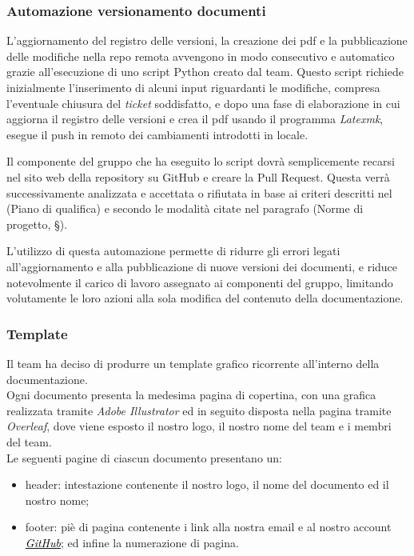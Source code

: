\documentclass[10pt, a4paper]{article}
\begin{document}
    \subsubsection{Automazione versionamento documenti}
    \label{sec:automazione_docs}
    L'aggiornamento del registro delle versioni, la creazione dei pdf e la pubblicazione delle modifiche nella repo remota avvengono in modo consecutivo e automatico grazie all'esecuzione di uno script Python creato dal team.
    Questo script richiede inizialmente l'inserimento di alcuni input riguardanti le modifiche, compresa l'eventuale chiusura del \textit{ticket} soddisfatto, e dopo una fase di elaborazione
    in cui aggiorna il registro delle versioni e crea il pdf usando il programma \textit{Latexmk}, esegue il push in remoto dei cambiamenti introdotti in locale.

    Il componente del gruppo che ha eseguito lo script dovrà semplicemente recarsi nel
    sito web della repository su GitHub e creare la Pull Request.
    Questa verrà successivamente analizzata e accettata o rifiutata in base ai criteri descritti nel (Piano di qualifica) e
    secondo le modalità citate nel paragrafo (Norme di progetto, \S {}).
    
    L'utilizzo di questa automazione permette di ridurre gli errori legati all'aggiornamento e alla pubblicazione di nuove
    versioni dei documenti, e riduce notevolmente il carico di lavoro assegnato ai componenti del gruppo, limitando
    volutamente le loro azioni alla sola modifica del contenuto della documentazione.

    \subsubsection{Template}
    Il team ha deciso di produrre un template grafico ricorrente all'interno della documentazione.\\
    Ogni documento presenta la medesima pagina di copertina, con una grafica realizzata tramite \textit{Adobe Illustrator} ed in seguito disposta nella pagina tramite \textit{Overleaf}, dove viene esposto il nostro logo, il nostro nome del team e i membri del team.\\
    Le seguenti pagine di ciascun documento presentano un:
        \begin{itemize}
            \item header: intestazione contenente il nostro logo, il nome del documento ed il nostro nome;
            \item footer: piè di pagina contenente i link alla nostra email e al nostro account \href{https://sweetcode-team.github.io/}{\textcolor{black}{\textit{GitHub}}}; ed infine la numerazione di pagina.
        \end{itemize}
    
\end{document}
